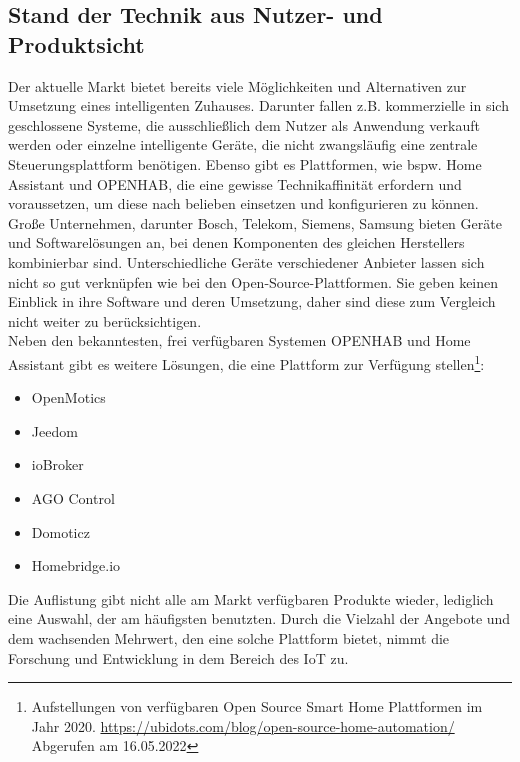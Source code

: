     \subsection{Stand der Technik aus Nutzer- und Produktsicht}
        Der aktuelle Markt bietet bereits viele Möglichkeiten und Alternativen zur Umsetzung eines intelligenten Zuhauses. 
        Darunter fallen z.B. kommerzielle in sich geschlossene Systeme, die ausschließlich dem Nutzer als Anwendung verkauft werden oder 
        einzelne intelligente Geräte, die nicht zwangsläufig eine zentrale Steuerungsplattform benötigen. Ebenso gibt es Plattformen, wie bspw. 
        Home Assistant und \acs{OPENHAB}, die eine gewisse Technikaffinität erfordern und voraussetzen, um diese nach belieben 
        einsetzen und konfigurieren zu können. Große Unternehmen, darunter Bosch, Telekom, Siemens, Samsung bieten Geräte 
        und Softwarelösungen an, bei denen Komponenten des gleichen Herstellers kombinierbar sind. Unterschiedliche Geräte verschiedener Anbieter lassen 
        sich nicht so gut verknüpfen wie bei den Open-Source-Plattformen. Sie geben keinen Einblick in ihre Software 
        und deren Umsetzung, daher sind diese zum Vergleich nicht weiter zu berücksichtigen. 
        \\
        \linebreak
        Neben den bekanntesten, frei verfügbaren Systemen \acs{OPENHAB} und Home Assistant gibt es weitere Lösungen, die eine 
        Plattform zur Verfügung stellen\footnote{Aufstellungen von verfügbaren Open Source Smart Home Plattformen im Jahr 2020. \url{https://ubidots.com/blog/open-source-home-automation/} Abgerufen am 16.05.2022}:
        \begin{itemize}
            \item OpenMotics
            \item Jeedom
            \item ioBroker
            \item AGO Control 
            \item Domoticz
            \item Homebridge.io
        \end{itemize}
        Die Auflistung gibt nicht alle am Markt verfügbaren Produkte wieder, lediglich eine Auswahl, der am häufigsten benutzten. 
        Durch die Vielzahl der Angebote und dem wachsenden Mehrwert, den eine solche Plattform bietet, 
        nimmt die Forschung und Entwicklung in dem Bereich des \acs{IoT} zu. 
        \\ 
